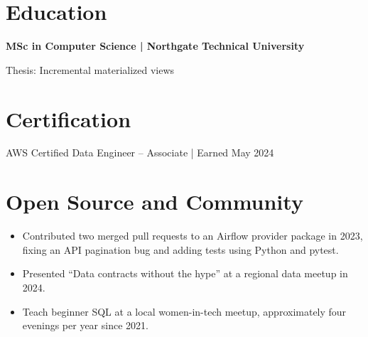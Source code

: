 \documentclass[11pt,a4paper]{article}
\newcommand{\cvsection}[1]{\section*{#1}}
\begin{document}
\cvsection{Education}
\textbf{MSc in Computer Science | Northgate Technical University}\par
Thesis: Incremental materialized views

\cvsection{Certification}
AWS Certified Data Engineer – Associate | Earned May 2024

\cvsection{Open Source and Community}
\begin{itemize}
\item Contributed two merged pull requests to an Airflow provider package in 2023, fixing an API pagination bug and adding tests using Python and pytest.
\item Presented “Data contracts without the hype” at a regional data meetup in 2024.
\item Teach beginner SQL at a local women-in-tech meetup, approximately four evenings per year since 2021.
\end{itemize}
\end{document}
